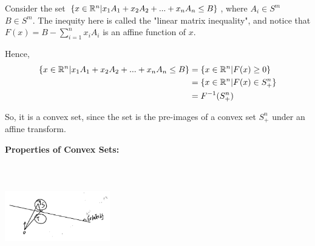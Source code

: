 \begin{example}
Consider the set $\{x\in \mathbb{R}^n | x_1A_1 + x_2A_2 + ... + x_nA_n \leq B\}$, where $A_i\in S^m$ $B\in S^m$. The inequity here is called the "linear matrix inequality", and notice that $F(x) = B - \sum^n_{i=1}x_iA_i$ is an affine function of $x$. 

Hence,
\begin{align*}
\{x\in \mathbb{R}^n | x_1A_1 + x_2A_2 + ... + x_nA_n \leq B\}
 &= \{x\in \mathbb{R}^n | F(x)\geq 0\}\\
 &= \{x\in \mathbb{R}^n | F(x)\in S^n_+ \}\\
 &=F^{-1}(S^n_+)
\end{align*}

So, it is a convex set, since the set is the pre-images of a convex set $S_+^n$ under an affine transform.
\end{example}

\vspace{0.5cm}
\textbf{Properties of Convex Sets:}
\begin{marginfigure}
	\centering
	\includegraphics[width=1.8in,height=1.8in]{figures/ch08/figure1030_2.png}
\end{marginfigure}


